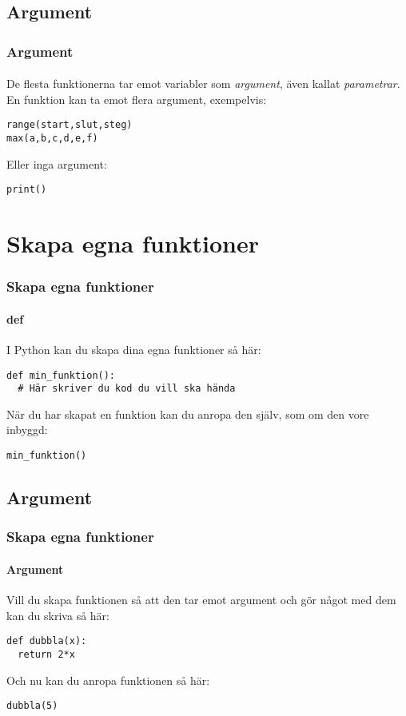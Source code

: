 \documentclass[aspectratio=169]{beamer}
\begin{document}
\subsection{Argument}

\begin{frame}[fragile]
	\frametitle{Argument}
	\framesubtitle{}
	
	De flesta funktionerna tar emot variabler som \textit{argument}, även kallat \textit{parametrar}. En funktion kan ta emot flera argument, exempelvis:
	
	\begin{lstlisting}
range(start,slut,steg)
max(a,b,c,d,e,f)
	\end{lstlisting}
	
	Eller inga argument:

	\begin{lstlisting}
print()
	\end{lstlisting}
	
\end{frame}

\section{Skapa egna funktioner}

\begin{frame}[fragile]
	\frametitle{Skapa egna funktioner}
	\framesubtitle{def}
	
	I Python kan du skapa dina egna funktioner så här:

	\begin{lstlisting}
def min_funktion():
  # Här skriver du kod du vill ska hända
	\end{lstlisting}

När du har skapat en funktion kan du anropa den själv, som om den vore inbyggd: 

	\begin{lstlisting}
min_funktion()
	\end{lstlisting}

\end{frame}

\subsection{Argument}

\begin{frame}[fragile]
	\frametitle{Skapa egna funktioner}
	\framesubtitle{Argument}
Vill du skapa funktionen så att den tar emot argument och gör något med dem kan 
du skriva så här: 

	\begin{lstlisting}
def dubbla(x): 
  return 2*x
	\end{lstlisting}
Och nu kan du anropa funktionen så här: 

	\begin{lstlisting}
dubbla(5)
	\end{lstlisting}
	
\end{frame}
\end{document}
